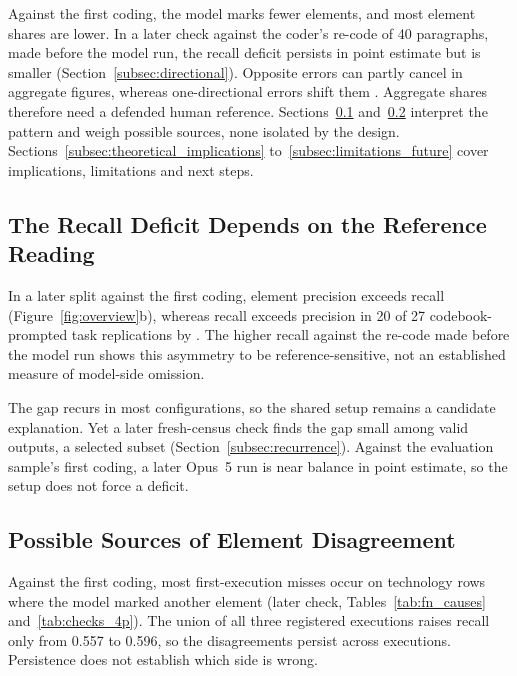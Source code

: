 Against the first coding, the model marks fewer elements, and most element shares are lower. In a later check against the coder's re-code of 40 paragraphs, made before the model run, the recall deficit persists in point estimate but is smaller (Section~\ref{subsec:directional}). Opposite errors can partly cancel in aggregate figures, whereas one-directional errors shift them \parencite[p.~2091]{edwards2026rogangladen}. Aggregate shares therefore need a defended human reference. Sections~\ref{subsec:interpretation} and~\ref{subsec:mechanisms} interpret the pattern and weigh possible sources, none isolated by the design. Sections~\ref{subsec:theoretical_implications} to~\ref{subsec:limitations_future} cover implications, limitations and next steps.

\subsection{The Recall Deficit Depends on the Reference Reading}\label{subsec:interpretation}\label{subsec:comparison_prior}

In a later split against the first coding, element precision exceeds recall (Figure~\ref{fig:overview}b), whereas recall exceeds precision in 20 of 27 codebook-prompted task replications by \textcite{pangakis2025humansintheloop}. The higher recall against the re-code made before the model run shows this asymmetry to be reference-sensitive, not an established measure of model-side omission.

The gap recurs in most configurations, so the shared setup remains a candidate explanation. Yet a later fresh-census check finds the gap small among valid outputs, a selected subset (Section~\ref{subsec:recurrence}). Against the evaluation sample's first coding, a later Opus~5 run is near balance in point estimate, so the setup does not force a deficit.

\subsection{Possible Sources of Element Disagreement}\label{subsec:mechanisms}

Against the first coding, most first-execution misses occur on technology rows where the model marked another element (later check, Tables~\ref{tab:fn_causes} and~\ref{tab:checks_4p}). The union of all three registered executions raises recall only from 0.557 to 0.596, so the disagreements persist across executions. Persistence does not establish which side is wrong.

